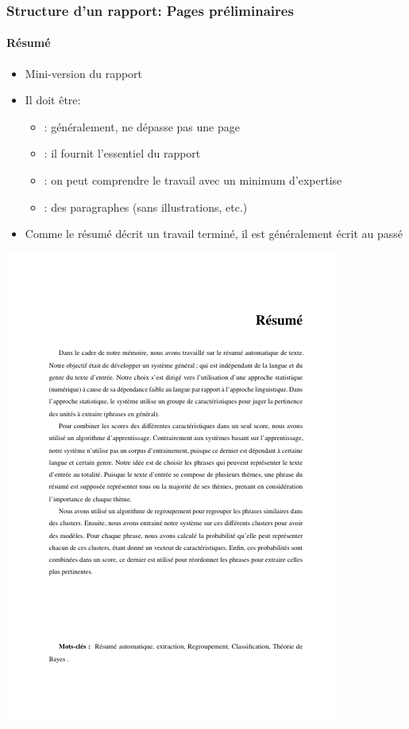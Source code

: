 \documentclass[xcolor=table]{beamer}
\begin{document}
\begin{frame}
\frametitle{Structure d'un rapport: Pages préliminaires}
\framesubtitle{Résumé}

\begin{minipage}{0.52\textwidth}
	\begin{itemize}
		\item Mini-version du rapport
		\item Il doit être:
		\begin{itemize}
			\item {}: généralement, ne dépasse pas une page
			\item {}: il fournit l'essentiel du rapport
			\item {}: on peut comprendre le travail avec un minimum d'expertise
			\item {}: des paragraphes (sans illustrations, etc.)
		\end{itemize}
		\item Comme le résumé décrit un travail terminé, il est généralement écrit au passé
	\end{itemize}
\end{minipage}
\begin{minipage}{0.42\textwidth}
	\includegraphics[width=\textwidth]{..//img/Bweb03-redaction/resume.png}
\end{minipage}

\end{frame}
\end{document}

